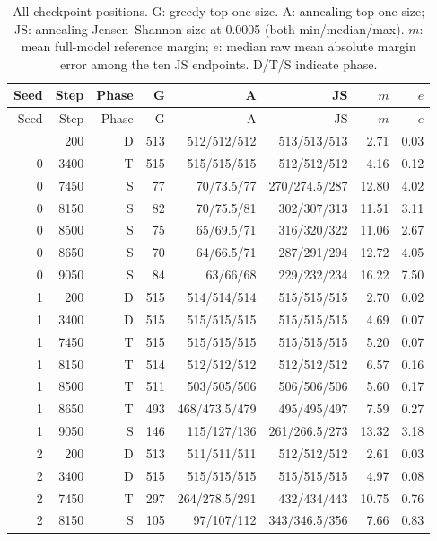 \begingroup\small\setlength{\tabcolsep}{4pt}
\begin{longtable}{rrrrrrrr}
\caption{All checkpoint positions. G: greedy top-one size. A: annealing top-one size; JS: annealing Jensen--Shannon size at 0.0005 (both min/median/max). $m$: mean full-model reference margin; $e$: median raw mean absolute margin error among the ten JS endpoints. D/T/S indicate phase.}\label{tab:positions}\\
\toprule
Seed & Step & Phase & G & A & JS & $m$ & $e$ \\

\midrule\endfirsthead
\toprule
Seed & Step & Phase & G & A & JS & $m$ & $e$ \\

\midrule\endhead
\bottomrule\endfoot
0 & 200 & D & 513 & 512/512/512 & 513/513/513 & 2.71 & 0.03 \\
0 & 3400 & T & 515 & 515/515/515 & 512/512/512 & 4.16 & 0.12 \\
0 & 7450 & S & 77 & 70/73.5/77 & 270/274.5/287 & 12.80 & 4.02 \\
0 & 8150 & S & 82 & 70/75.5/81 & 302/307/313 & 11.51 & 3.11 \\
0 & 8500 & S & 75 & 65/69.5/71 & 316/320/322 & 11.06 & 2.67 \\
0 & 8650 & S & 70 & 64/66.5/71 & 287/291/294 & 12.72 & 4.05 \\
0 & 9050 & S & 84 & 63/66/68 & 229/232/234 & 16.22 & 7.50 \\
1 & 200 & D & 515 & 514/514/514 & 515/515/515 & 2.70 & 0.02 \\
1 & 3400 & D & 515 & 515/515/515 & 515/515/515 & 4.69 & 0.07 \\
1 & 7450 & T & 515 & 515/515/515 & 515/515/515 & 5.20 & 0.07 \\
1 & 8150 & T & 514 & 512/512/512 & 512/512/512 & 6.57 & 0.16 \\
1 & 8500 & T & 511 & 503/505/506 & 506/506/506 & 5.60 & 0.17 \\
1 & 8650 & T & 493 & 468/473.5/479 & 495/495/497 & 7.59 & 0.27 \\
1 & 9050 & S & 146 & 115/127/136 & 261/266.5/273 & 13.32 & 3.18 \\
2 & 200 & D & 513 & 511/511/511 & 512/512/512 & 2.61 & 0.03 \\
2 & 3400 & D & 515 & 515/515/515 & 515/515/515 & 4.97 & 0.08 \\
2 & 7450 & T & 297 & 264/278.5/291 & 432/434/443 & 10.75 & 0.76 \\
2 & 8150 & S & 105 & 97/107/112 & 343/346.5/356 & 7.66 & 0.83 \\

\end{longtable}
